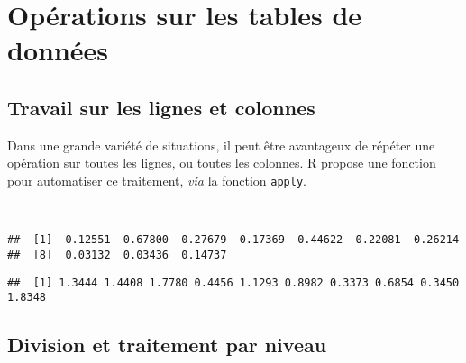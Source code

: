 \chapter{Opérations sur les tables de données\label{c:tables}}

\section{Travail sur les lignes et colonnes}

Dans une grande variété de situations, il peut être avantageux de répéter une opération sur toutes les lignes, ou toutes les colonnes.
R propose une fonction pour automatiser ce traitement, \emph{via} la fonction \texttt{apply}. 

\begin{knitrout}
\color{fgcolor}\begin{kframe}
\begin{flushleft}
\ttfamily\noindent
{}\hlassignement{\usebox{\hlnormalsizeboxlessthan}-}{\ }\hlkeyword{(}\hlkeyword{(}\hlkeyword{)}\hlkeyword{,}{\ }\hlargument{=}{\ }\hlkeyword{)}\hspace*{\fill}\\
\hlstd{}\hlkeyword{(}\hlkeyword{,}{\ }\hlkeyword{,}{\ }\hlkeyword{)}\mbox{}
\normalfont
\end{flushleft}
\begin{verbatim}
##  [1]  0.12551  0.67800 -0.27679 -0.17369 -0.44622 -0.22081  0.26214
##  [8]  0.03132  0.03436  0.14737
\end{verbatim}
\begin{flushleft}
\ttfamily\noindent
{}\hlkeyword{(}\hlkeyword{,}{\ }\hlkeyword{,}{\ }\hlkeyword{)}\mbox{}
\normalfont
\end{flushleft}
\begin{verbatim}
##  [1] 1.3444 1.4408 1.7780 0.4456 1.1293 0.8982 0.3373 0.6854 0.3450 1.8348
\end{verbatim}
\end{kframe}
\end{knitrout}


\section{Division et traitement par niveau}

